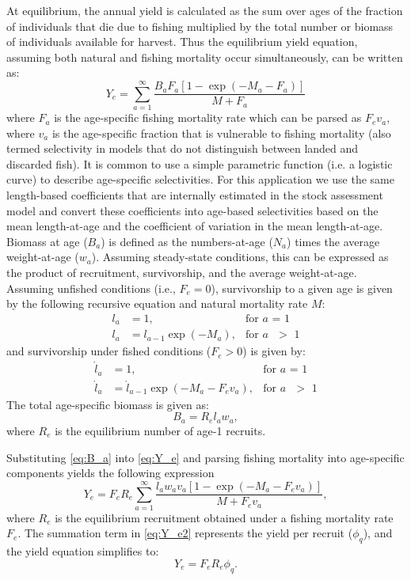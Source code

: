 \documentclass[12pt,leqno]{article}
\begin{document}
At equilibrium, the annual yield is calculated as the sum over ages of the fraction of individuals that die due to fishing multiplied by the total number or biomass of individuals available for harvest.  Thus the equilibrium yield equation, assuming both natural and fishing mortality occur simultaneously,  can be written as:
\begin{equation}\label{eq:Y_e}
	Y_e = \sum_{a=1}^\infty \frac{B_a F_a [1-\exp(-M_a-F_a)]}{M+F_a}
\end{equation}
where $F_a$ is the age-specific fishing mortality rate which can be parsed as $F_e v_a$, where $v_a$ is the age-specific fraction that is vulnerable to fishing mortality (also termed selectivity in models that do not distinguish between landed and discarded fish).  It is common to use a simple parametric function (i.e. a logistic curve) to describe age-specific selectivities.  For this application we use the same length-based coefficients that are internally estimated in the stock assessment model and convert these coefficients into age-based selectivities based on the mean length-at-age and the coefficient of variation in the mean length-at-age.  Biomass at age ($B_a$) is defined as the numbers-at-age ($N_a$) times the average weight-at-age ($w_a$).  Assuming steady-state conditions, this can be expressed as the product of recruitment, survivorship, and the average weight-at-age.  Assuming unfished conditions (i.e., $F_e=0$), survivorship to a given age is given by the following recursive equation and natural mortality rate $M$:
\begin{align}\label{eq:unfished_survivorship}
	l_a &= 1,  &\mbox{for $a$ = 1} \nonumber \\
	l_a &= l_{a-1} \exp(-M_a),& \mbox{for $a$ $>$ 1}
\end{align}
and survivorship under fished conditions ($F_e > 0$) is given by:
\begin{align}\label{eq:fished_survivorship}
	\acute{l}_a &=1, &\mbox{for $a$ = 1} \nonumber\\
	\acute{l}_{a} &= \acute{l}_{a-1} \exp(-M_a-F_e v_a), &\mbox{for $a$ $>$ 1} 
\end{align}
The total age-specific biomass  is given as:
\begin{equation} \label{eq:B_a}
	B_a = R_e l_a w_a,
\end{equation}
where $R_e$ is the equilibrium number of age-1 recruits.

Substituting \eqref{eq:B_a} into  \eqref{eq:Y_e} and parsing fishing mortality into age-specific components yields the following expression
\begin{equation}\label{eq:Y_e2}
	Y_e = F_e R_e \sum_{a=1}^\infty \frac{l_a w_a v_a [1-\exp(-M_a-F_e v_a)]}{M+F_e v_a},
\end{equation}
where $R_e$ is the equilibrium recruitment obtained under a fishing mortality rate $F_e$. The summation term in \eqref{eq:Y_e2} represents the yield per recruit ($\phi_q$), and the yield equation simplifies to:
\begin{equation}\label{eq:Y_e3}
	Y_e = F_e R_e \phi_q.
\end{equation}
\end{document}
